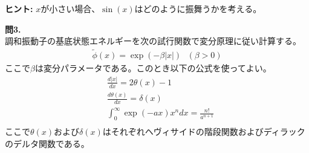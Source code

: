 \documentclass{jlreq}
\begin{document}
\noindent
\textbf{ヒント:} $x$が小さい場合、$\sin(x)$はどのように振舞うかを考える。

\clearpage

\noindent
\textbf{問3.}\\

\noindent
調和振動子の基底状態エネルギーを次の試行関数で変分原理に従い計算する。
\begin{eqnarray}
    \tilde{\phi}(x)=\exp(-\beta|x|) \ \ \ (\beta>0)
\end{eqnarray}  
ここで$\beta$は変分パラメータである。このとき以下の公式を使ってよい。
\begin{eqnarray}
    &\frac{d|x|}{dx}=2\theta(x)-1 \\
    &\frac{d\theta(x)}{dx}=\delta(x) \\
    &\int_0^\infty \exp(-ax)x^n dx=\frac{n!}{a^{n+1}} \\
\end{eqnarray}  
ここで$\theta(x)$および$\delta(x)$はそれぞれヘヴィサイドの階段関数およびディラックのデルタ関数である。\\

\end{document}
